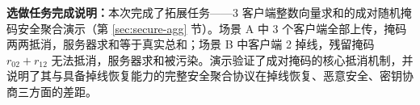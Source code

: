 \documentclass{SYSUReport}
\begin{document}
\textbf{选做任务完成说明：}本次完成了拓展任务——3 客户端整数向量求和的成对随机掩码安全聚合演示（第 \ref{sec:secure-agg} 节）。场景 A 中 3 个客户端全部上传，掩码两两抵消，服务器求和等于真实总和；场景 B 中客户端 2 掉线，残留掩码 $r_{02}+r_{12}$ 无法抵消，服务器求和被污染。演示验证了成对掩码的核心抵消机制，并说明了其与具备掉线恢复能力的完整安全聚合协议在掉线恢复、恶意安全、密钥协商三方面的差距。


\nocite{*}

\end{document}
